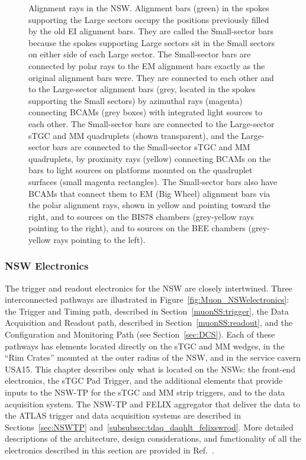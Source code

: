 \documentclass[cernpreprint, atlasdraft=false, UKenglish,british,orcidlogo, texmf, orcidlogo]{atlasdoc}
\begin{document}
\begin{figure}[!h]
\caption{Alignment rays in the \gls{NSW}.  \protect{} Alignment bars (green) in the spokes  supporting the Large sectors occupy the positions previously filled by the old EI alignment bars.
They are called the Small-sector bars because the spokes supporting Large sectors sit in the Small sectors on either side of each Large sector.
The Small-sector bars are connected by polar rays to the EM alignment bars exactly as the original alignment bars were.
They are connected to each other and to the Large-sector alignment bars (grey, located in the spokes supporting the Small sectors) by azimuthal rays (magenta) connecting \glspl{BCAM} (grey boxes) with integrated light sources to each other. \protect{} The Small-sector bars are connected to the Large-sector \gls{sTGC} and \gls{MM} quadruplets (shown transparent), and the Large-sector bars are connected to the Small-sector \gls{sTGC} and \gls{MM} quadruplets, by proximity rays (yellow) connecting \glspl{BCAM} on the bars to light sources on platforms mounted on the quadruplet surfaces (small magenta rectangles). The Small-sector bars also have \glspl{BCAM} that connect them to EM (Big Wheel) alignment bars via the polar alignment rays, shown in yellow and pointing toward the right, and to sources on the \gls{BIS78} chambers (grey-yellow rays pointing to the right), and to sources on the BEE chambers (grey-yellow rays pointing to the left).
\label{figMuon:Alignment_principle}}
\end{figure}
 
\subsubsection{NSW Electronics \label{muonSS:electronics}}
The trigger and readout electronics for the \gls{NSW} are closely intertwined.
Three interconnected pathways are illustrated in Figure~\ref{fig:Muon_NSWelectronics}: the Trigger and Timing path, described in Section~\ref{muonSS:trigger}, the Data Acquisition and Readout path, described in Section~\ref{muonSS:readout}, and the Configuration and Monitoring Path (see Section~\ref{sec:DCS}).
Each of these pathways has elements located directly on the \gls{sTGC} and \gls{MM} wedges, in the ``Rim Crates'' mounted at the outer radius of the \gls{NSW}, and in the service cavern \gls{USA15}.
This chapter describes only what is located on the \glspl{NSW}: the front-end electronics, the \gls{sTGC} Pad Trigger, and the additional elements that provide inputs to the \gls{NSW-TP} for the \gls{sTGC} and \gls{MM} strip triggers, and to the data acquisition system.
The \gls{NSW-TP} and \gls{FELIX} aggregator that deliver the data to the ATLAS trigger and
data acquisition systems are described in Sections~\ref{sec:NSWTP} and~\ref{subsubsec:tdaq_daqhlt_felixswrod}.
More detailed descriptions of the architecture, design considerations, and functionality of all the electronics described in this section are provided in Ref.~\cite{NSWelx}.
 
\end{document}

